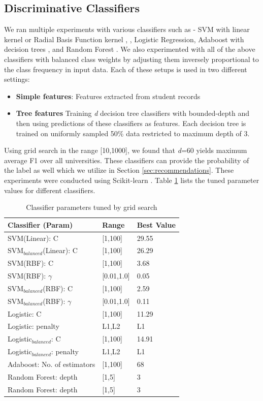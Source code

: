 \documentclass{sig-alternate-05-2015}
\begin{document}
\subsection{Discriminative Classifiers}
\label{subsec:supervised-exp}
We ran multiple experiments with various classifiers such as - SVM with linear kernel or Radial Basis Function kernel \cite{libsvm}, \cite{svmtutorial}, Logistic Regression, Adaboost \cite{adaboost} with decision trees \cite{decisiontree}, and Random Forest \cite{randomforest}. We also experimented with all of the above classifiers with balanced class weights by adjusting them inversely proportional to the class frequency in input data. Each of these setups is used in two different settings:
\begin{itemize}
\item \textbf{Simple features}: Features extracted from student records
\item \textbf{Tree features} Training \textit{d} decision tree classifiers with bounded-depth and then using predictions of these classifiers as features. Each decision tree is trained on uniformly sampled 50\% data restricted to maximum depth of 3.
\end{itemize}
Using grid search in the range [10,1000], we found that \textit{d}=60 yields maximum average F1 over all universities. These classifiers can provide the probability of the label as well which we utilize in Section \ref{sec:recommendations}. These experiments were conducted using Scikit-learn \cite{scikit-learn}. Table \ref{tab:params} lists the tuned parameter values for different classifiers. 

\begin{table}[h]
\centering
\caption{Classifier parameters tuned by grid search}
\label{tab:params}
\begin{tabular}{l l l}
\hline
Classifier (Param) & Range & Best Value \\ \hline
SVM(Linear): C & [1,100] & 29.55 \\
SVM$_{balanced}$(Linear): C & [1,100] & 26.29 \\ \hline
SVM(RBF): C & [1,100] & 3.68 \\
SVM(RBF): $\gamma$ & [0.01,1.0] & 0.05 \\
SVM$_{balanced}$(RBF): C & [1,100] & 2.59 \\
SVM$_{balanced}$(RBF): $\gamma$ & [0.01,1.0] & 0.11 \\ \hline
Logistic: C & [1,100] & 11.29 \\
Logistic: penalty & {L1,L2} & L1 \\
Logistic$_{balanced}$: C & [1,100] & 14.91 \\
Logistic$_{balanced}$: penalty & {L1,L2} & L1 \\ \hline
Adaboost: No. of estimators & [1,100] & 68 \\ \hline
Random Forest: depth & [1,5] & 3 \\
Random Forest: depth & [1,5] & 3 \\ \hline 
\end{tabular}
\end{table}
\end{document}
